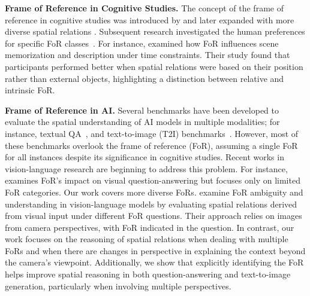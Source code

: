 \noindent\textbf{Frame of Reference in Cognitive Studies.}
The concept of the frame of reference in cognitive studies was introduced by \citealt{Levinson_2003} and later expanded with more diverse spatial relations \citep{TENBRINK2011704}.
Subsequent research investigated the human preferences for specific FoR classes~\citep{Edmonds-Wathen852956, VUKOVIC2015110, SHUSTERMAN2016115, Ruotolo2016}. For instance, \citealt{Ruotolo2016} examined how FoR influences scene memorization and description under time constraints. Their study found that participants performed better when spatial relations were based on their position rather than external objects, highlighting a distinction between relative and intrinsic FoR.

\noindent\textbf{Frame of Reference in AI.}
Several benchmarks have been developed to evaluate the spatial understanding of AI models in multiple modalities; for instance, %
textual QA~\citep{shi2022stepgamenewbenchmarkrobust, mirzaee2022transferlearningsyntheticcorpora, rizvi2024sparcsparpspatialreasoning}, and text-to-image (T2I) benchmarks~\citep{gokhale2023benchmarkingspatialrelationshipstexttoimage, huang2023t2icompbenchcomprehensivebenchmarkopenworld, cho2023dallevalprobingreasoningskills, cho2023visualprogrammingtexttoimagegeneration}.
However, most of these benchmarks overlook the frame of reference (FoR), assuming a single FoR for all instances despite its significance in cognitive studies.
Recent works in vision-language research are beginning to address this problem. 
For instance, \citealt{liu2023visualspatialreasoning} examines FoR’s impact on visual question-answering but focuses only on limited FoR categories. Our work covers more diverse FoRs.
\citealt{comfortFoR} examine FoR ambiguity and understanding in vision-language models by evaluating spatial relations derived from visual input under different FoR questions. 
Their approach relies on images from camera perspectives, with FoR indicated in the question.
In contrast, our work focuses on the reasoning of spatial relations when dealing with multiple FoRs and when there are changes in perspective in explaining the context beyond the camera’s viewpoint. 
Additionally, we show that explicitly identifying the FoR helps improve spatial reasoning in both question-answering and text-to-image generation, particularly when involving multiple perspectives.
